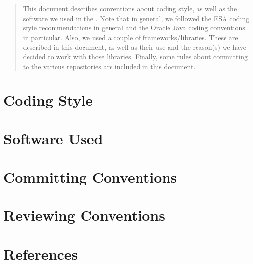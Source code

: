 
\renewcommand{\pathtobase}[1]{../#1}

\renewcommand{\TitelFull}{Conventions about Coding Style and Software}
\renewcommand{\TitelAbbr}{CaCSaS}
\renewcommand{\Version}{0.1}



\fingerpainttitlepage{}

\begin{abstract}
This document describes conventions about coding style, as well as the software we used in the \applicationname. Note that in general, we followed the ESA coding style recommendations \cite{esa-coding-style} in general and the Oracle Java coding conventions \cite{oracle-java-coding-style} in particular. Also, we used a couple of frameworks/libraries. These are described in this document, as well as their use and the reason(s) we have decided to work with those libraries. Finally, some rules about committing to the various repositories are included in this document.
\end{abstract}

\tableofcontents



\chapter{Coding Style}
\label{chap:coding-style}


\chapter{Software Used}
\label{chap:software-used}


\chapter{Committing Conventions}
\label{chap:commit-conventions}


\chapter{Reviewing Conventions}
\label{chap:review-conventions}


\chapter{References}


